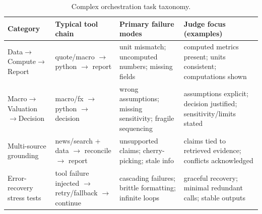 \documentclass{article}
\begin{document}
\begin{table}[t]
\centering
\caption{Complex orchestration task taxonomy.}
\label{tab:taxonomy}
\begin{tabular}{p{2.7cm}p{3.2cm}p{3.3cm}p{4.3cm}}
\toprule
\textbf{Category} & \textbf{Typical tool chain} & \textbf{Primary failure modes} & \textbf{Judge focus (examples)} \\
\midrule
Data$\rightarrow$Compute$\rightarrow$Report &
quote/macro $\rightarrow$ python $\rightarrow$ report &
unit mismatch; uncomputed numbers; missing fields &
computed metrics present; units consistent; computations shown \\
\addlinespace
Macro$\rightarrow$Valuation$\rightarrow$Decision &
macro/fx $\rightarrow$ python $\rightarrow$ decision &
wrong assumptions; missing sensitivity; fragile sequencing &
assumptions explicit; decision justified; sensitivity/limits stated \\
\addlinespace
Multi-source grounding &
news/search + data $\rightarrow$ reconcile $\rightarrow$ report &
unsupported claims; cherry-picking; stale info &
claims tied to retrieved evidence; conflicts acknowledged \\
\addlinespace
Error-recovery stress tests &
tool failure injected $\rightarrow$ retry/fallback $\rightarrow$ continue &
cascading failures; brittle formatting; infinite loops &
graceful recovery; minimal redundant calls; stable outputs \\
\bottomrule
\end{tabular}
\end{table}
\end{document}
